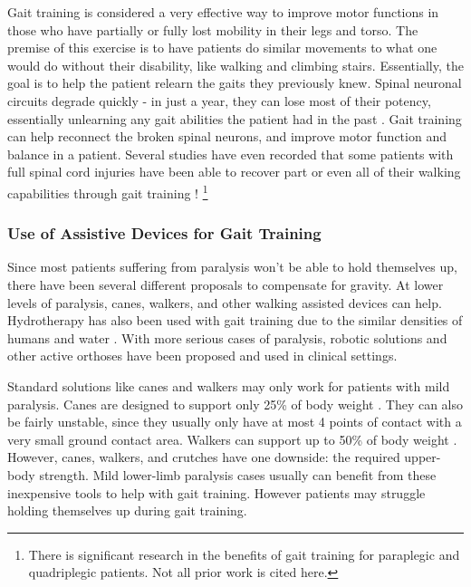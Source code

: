 Gait training is considered a very effective way to improve motor functions in those who have partially or fully lost mobility in their legs and torso. The premise of this exercise is to have patients do similar movements to what one would do without their disability, like walking and climbing stairs. Essentially, the goal is to help the patient relearn the gaits they previously knew. Spinal neuronal circuits degrade quickly - in just a year, they can lose most of their potency, essentially unlearning any gait abilities the patient had in the past \cite{GaitTrainingClinical} \cite{RehabParaplegia} \cite{TrunkMuscleLoadingParaplegia}. Gait training can help reconnect the broken spinal neurons, and improve motor function and balance in a patient. Several studies have even recorded that some patients with full spinal cord injuries have been able to recover part or even all of their walking capabilities through gait training \cite{GaitTrainingClinical} \cite{ImprovingGaitAdaptabilityInPatients}! 
\footnote{There is significant research in the benefits of gait training for paraplegic and quadriplegic patients. Not all prior work is cited here.} 

\subsubsection{Use of Assistive Devices for Gait Training}
Since most patients suffering from paralysis won't be able to hold themselves up, there have been several different proposals to compensate for gravity. At lower levels of paralysis, canes, walkers, and other walking assisted devices can help. Hydrotherapy has also been used with gait training due to the similar densities of humans and water \cite{BenefitsOfHydrotherapy}. With more serious cases of paralysis, robotic solutions and other active orthoses have been proposed and used in clinical settings.

Standard solutions like canes and walkers may only work for patients with mild paralysis. Canes are designed to support only 25\% of body weight \cite{RehabParaplegia}. They can also be fairly unstable, since they usually only have at most 4 points of contact with a very small ground contact area. Walkers can support up to 50\% of body weight \cite{RehabParaplegia}. However, canes, walkers, and crutches have one downside: the required upper-body strength. Mild lower-limb paralysis cases usually can benefit from these inexpensive tools to help with gait training. However patients may struggle holding themselves up during gait training.

